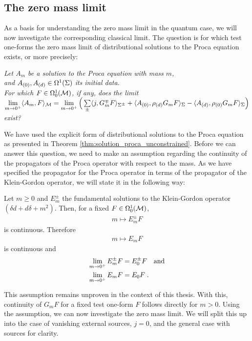 \subsection{The zero mass limit}\label{sec:zero-mass-limit-classical}
As a basis for understanding the zero mass limit in the quantum case, we will now investigate the corresponding classical limit. The question is for which test one-forms the zero mass limit of distributional solutions to the Proca equation exists, or more precisely:
\begin{center}\textit{
		Let $A_m$ be a solution to the Proca equation with mass $m$,\\ and ${A_{(0)}},{A_{(d)}} \in \Omega^1(\Sigma)$ its initial data.\\ For which $F \in \Omega^1_0(\mathcal{M})$, if any, does the limit $\lim\limits_{m\to 0^+} \langle A_m , F \rangle_{\mathcal{M}} = \lim\limits_{m \to 0^+}\Big( \sum\limits_\pm \langle j , G_m^\mp F   \rangle_{\Sigma^\pm} +\langle {A_{(0)}} , \rho_{(d)} G_m F \rangle_\Sigma
		- \langle {A_{(d)}} , \rho_{(0)} G_m F \rangle_\Sigma \Big)$ exist?}
\end{center}
We have used the explicit form of distributional solutions to the Proca equation as presented in Theorem \ref{thm:solution_proca_unconstrained}.
Before we can answer this question, we need to make an assumption regarding the continuity of the propagators of the Proca operator with respect to the mass. As we have specified the propagator for the Proca operator in terms of the propagator of the Klein-Gordon operator, we will state it in the following way:
\begin{assumption}\label{ass:propagator_continuity}
	Let $m\geq 0$ and $E_m^\pm$ the fundamental solutions to the Klein-Gordon operator $(\delta d + d \delta + m^2)$. Then, for a fixed $F\in \Omega^1_0(\mathcal{M})$,
	\begin{align}
		m \mapsto E^\pm_m F
	\end{align}
	is continuous. Therefore
		\begin{align}
		m \mapsto E_m F
		\end{align}
	is continuous and
	\begin{align}
	\lim\limits_{m \to 0^+} E^\pm_m F &= E^\pm_0 F \quad \text{and} \\
		\lim\limits_{m \to 0^+} E_m F &= E_0 F \;.
	\end{align}
\end{assumption}
This assumption remains unproven in the context of this thesis. With this, continuity of $G_m F$ for a fixed test one-form $F$ follows directly for $m>0$. Using the assumption, we can now investigate the zero mass limit.
We will split this up into the case of vanishing external sources, $j=0$, and the general case with sources for clarity.
%
%
%
%
%
%
%
%
